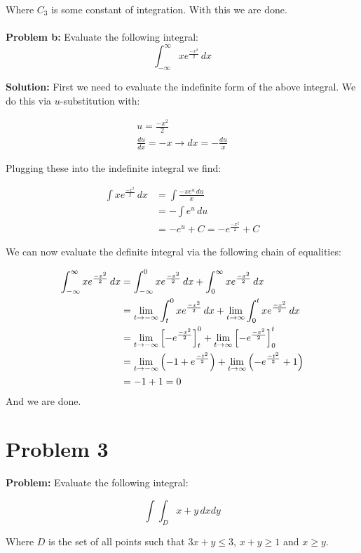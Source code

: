 \documentclass{article}
\begin{document}
Where $C_3$ is some constant of integration. With this we are done.
\\\\

\noindent\textbf{Problem b:} Evaluate the following integral:
$$\int_{-\infty}^\infty xe^{\frac{-x^2}{2}}\, dx$$

\noindent\textbf{Solution:} First we need to evaluate the indefinite form of the above integral. We do this via $u$-substitution with:

\begin{gather*}
    u=\frac{-x^2}{2}\\
    \frac{du}{dx}=-x\rightarrow dx=-\frac{du}{x}
\end{gather*}

Plugging these into the indefinite integral we find:

\begin{align*}
    \int xe^{\frac{-x^2}{2}}\, dx &= \int \frac{-xe^u\, du}{x}\\
    &= -\int e^u\, du\\
    &=-e^u+C=-e^{\frac{-x^2}{2}}+C
\end{align*}

We can now evaluate the definite integral via the following chain of equalities:

\begin{align*}
    \int_{-\infty}^\infty xe^{\frac{-x^2}{2}}\, dx&=\int_{-\infty}^0 xe^{\frac{-x^2}{2}}\, dx+\int_0^\infty xe^{\frac{-x^2}{2}}\, dx\\
    &=\lim_{t\to-\infty}\int_t^0 xe^{\frac{-x^2}{2}}\, dx+\lim_{t\to\infty}\int_0^t xe^{\frac{-x^2}{2}}\, dx\\
    &=\lim_{t\to-\infty}\left[-e^{\frac{-x^2}{2}}\right]_{t}^{0}+\lim_{t\to\infty}\left[-e^{\frac{-x^2}{2}}\right]_{0}^{t}\\
    &=\lim_{t\to-\infty}\left(-1+e^{\frac{-t^2}{2}}\right)+\lim_{t\to\infty}\left(-e^{\frac{-t^2}{2}}+1\right)\\
    &=-1+1=0\\
\end{align*}
\indent And we are done.

\section*{Problem 3}
\noindent\textbf{Problem:} Evaluate the following integral:

$$\int\int_D x+y\,dxdy$$

Where $D$ is the set of all points such that $3x+y\le 3$, $x+y\ge 1$ and $x\ge y$.
\\
\end{document}
